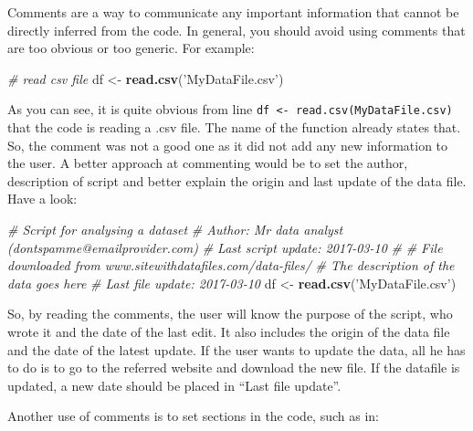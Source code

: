 \documentclass[11pt,]{book}
\newenvironment{Shaded}{\begin{snugshade}}{\end{snugshade}}
\newcommand{\KeywordTok}[1]{\textcolor[rgb]{0.27,0.27,0.27}{\textbf{#1}}}
\newcommand{\StringTok}[1]{\textcolor[rgb]{0.5,0.5,0.5}{#1}}
\newcommand{\CommentTok}[1]{\textcolor[rgb]{0.56,0.35,0.01}{\textit{#1}}}
\newcommand{\NormalTok}[1]{#1}
\begin{document}
Comments are a way to communicate any important information that cannot
be directly inferred from the code. In general, you should avoid using
comments that are too obvious or too generic. For example:

\begin{Shaded}
\begin{Highlighting}[]
\CommentTok{# read csv file}
\NormalTok{df <-}\StringTok{ }\KeywordTok{read.csv}\NormalTok{(}\StringTok{'MyDataFile.csv'}\NormalTok{)}
\end{Highlighting}
\end{Shaded}

As you can see, it is quite obvious from line
\texttt{df\ \textless{}-\ read.csv(\textquotesingle{}MyDataFile.csv)}
that the code is reading a .csv file. The name of the function already
states that. So, the comment was not a good one as it did not add any
new information to the user. A better approach at commenting would be to
set the author, description of script and better explain the origin and
last update of the data file. Have a look:

\begin{Shaded}
\begin{Highlighting}[]
\CommentTok{# Script for analysing a dataset}
\CommentTok{# Author: Mr data analyst (dontspamme@emailprovider.com)}
\CommentTok{# Last script update: 2017-03-10}
\CommentTok{#}
\CommentTok{# File downloaded from www.sitewithdatafiles.com/data-files/}
\CommentTok{# The description of the data goes here}
\CommentTok{# Last file update: 2017-03-10}
\NormalTok{df <-}\StringTok{ }\KeywordTok{read.csv}\NormalTok{(}\StringTok{'MyDataFile.csv'}\NormalTok{)}
\end{Highlighting}
\end{Shaded}

So, by reading the comments, the user will know the purpose of the
script, who wrote it and the date of the last edit. It also includes the
origin of the data file and the date of the latest update. If the user
wants to update the data, all he has to do is to go to the referred
website and download the new file. If the datafile is updated, a new
date should be placed in ``Last file update''.

Another use of comments is to set sections in the code, such as in:
\end{document}
